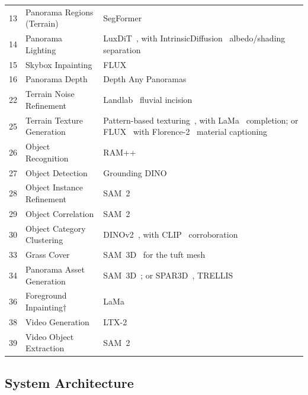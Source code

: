 \begin{table}[htbp]
\begin{tabular}{@{}r l >{\raggedright\arraybackslash}p{8.1cm}@{}}
13 & Panorama Regions (Terrain)     & SegFormer~\cite{DBLP:journals/corr/abs-2105-15203} \\
14 & Panorama Lighting              & LuxDiT~\cite{liang2025luxdit}, with IntrinsicDiffusion~\cite{Luo2024IntrinsicDiffusion} albedo/shading separation \\
15 & Skybox Inpainting              & FLUX~\cite{esser2024scalingrectifiedflowtransformers} \\
16 & Panorama Depth                 & Depth Any Panoramas~\cite{lin2025dap} \\
22 & Terrain Noise Refinement       & Landlab~\cite{barnhart2020landlab,hobley2017creative,Hutton_landlab_2020} fluvial incision \\
25 & Terrain Texture Generation     & Pattern-based texturing~\cite{neyret:inria-00537511}, with LaMa~\cite{suvorov2021resolution} completion; or FLUX~\cite{esser2024scalingrectifiedflowtransformers} with Florence-2~\cite{xiao2024florence2} material captioning \\
26 & Object Recognition             & RAM++~\cite{huang2023open} \\
27 & Object Detection               & Grounding DINO~\cite{liu2024groundingdino} \\
28 & Object Instance Refinement     & SAM~2~\cite{ravi2024sam2segmentimages} \\
29 & Object Correlation             & SAM~2~\cite{ravi2024sam2segmentimages} \\
30 & Object Category Clustering     & DINOv2~\cite{oquab2024dinov2}, with CLIP~\cite{radford2021learningtransferablevisual} corroboration \\
33 & Grass Cover                    & SAM~3D~\cite{sam3dteam2025sam3d3dfyimages} for the tuft mesh \\
34 & Panorama Asset Generation      & SAM~3D~\cite{sam3dteam2025sam3d3dfyimages}; or SPAR3D~\cite{huang2025spar3dstablepointawarereconstruction}, TRELLIS~\cite{xiang2025trellis2} \\
36 & Foreground Inpainting$\dagger$ & LaMa~\cite{suvorov2021resolution} \\
38 & Video Generation               & LTX-2~\cite{lightricks2026ltx2} \\
39 & Video Object Extraction        & SAM~2~\cite{ravi2024sam2segmentimages} \\
\bottomrule
\end{tabular}
\end{table}

\subsection{System Architecture}

